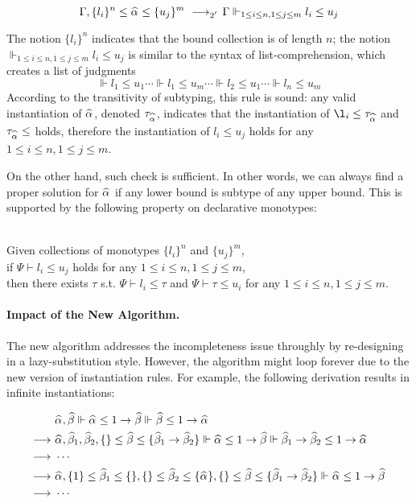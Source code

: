 $$
\Gm, \{l_i\}^n \le \al \le \{u_j\}^m \rrule{2'} \Gm \Vdash_{1 \le i \le n, 1 \le j \le m} l_i \le u_j
$$

The notion $\{l_i\}^n$ indicates that the bound collection is of length $n$;
the notion
$\Vdash_{1 \le i \le n, 1 \le j \le m} l_i \le u_j$
is similar to the syntax of list-comprehension, which creates a list of judgments
$$\Vdash l_1 \le u_1 \cdots \Vdash l_1 \le u_m \cdots \Vdash l_2 \le u_1
\cdots \Vdash l_n \le u_m$$
According to the transitivity of subtyping, this rule is sound:
any valid instantiation of $\al$, denoted $\tau_{\al}$, indicates that
the instantiation of $\l_i \le \tau_{\al}$ and $\tau_{\al} \le $ holds,
therefore the instantiation of $l_i \le u_j$ holds for any $1 \le i \le n, 1 \le j \le m$.

On the other hand, such check is sufficient. In other words,
we can always find a proper solution for $\al$ if any lower bound
is subtype of any upper bound.
This is supported by the following property on declarative monotypes:
\begin{lemma}~\\
    Given collections of monotypes $\{l_i\}^n$ and $\{u_j\}^m$,\\
    if $\Psi \vdash l_i \le u_j$ holds for any $1 \le i \le n, 1 \le j \le m$,\\
    then there exists $\tau$ s.t. $\Psi \vdash l_i \le \tau$ and $\Psi \vdash \tau \le u_i$
    for any $1 \le i \le n, 1 \le j \le m$.
\end{lemma}

\paragraph{Impact of the New Algorithm.}

The new algorithm addresses the incompleteness issue throughly by
re-designing in a lazy-substitution style.
However, the algorithm might loop forever due to the
new version of instantiation rules.
For example, the following derivation results in infinite instantiations:

\begin{gather*}
    \begin{aligned}
     & \al, \bt \Vdash \al \le 1 \to \bt \Vdash \bt \le 1 \to \al\\
\rto~& \al, \bt[1], \bt[2], \{\} \le \bt \le \{\bt[1] \to \bt[2]\}
        \Vdash \al \le 1 \to \bt \Vdash \bt[1] \to \bt[2] \le 1 \to \al\\
\rto~& \cdots\\
\rto~& \al, \{1\} \le \bt[1] \le \{\}, \{\} \le \bt[2] \le \{\al\},
        \{\} \le \bt \le \{\bt[1] \to \bt[2]\}
        \Vdash \al \le 1 \to \bt\\
\rto~& \cdots\\
    \end{aligned}
\end{gather*}


